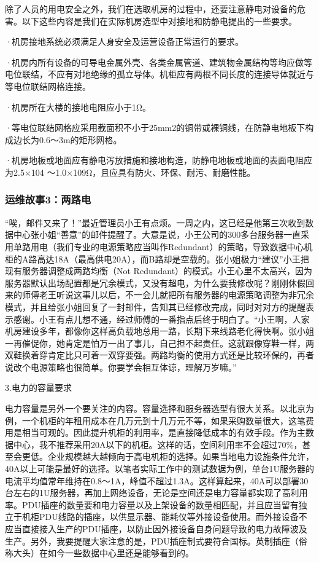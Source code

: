 \documentclass[12pt,UTF8]{ctexbook}
\begin{document}
除了人员的用电安全之外，我们在选取机房的过程中，还要注意静电对设备的危害。以下这些内容是我们在实际机房选型中对接地和防静电提出的一些要求。

·机房接地系统必须满足人身安全及运营设备正常运行的要求。

·机房内所有设备的可导电金属外壳、各类金属管道、建筑物金属结构等均应做等电位联结，不应有对地绝缘的孤立导体。机柜应有两根不同长度的连接导体就近与等电位联结网格连接。

·机房所在大楼的接地电阻应小于1Ω。

·等电位联结网格应采用截面积不小于25mm2的铜带或裸铜线，在防静电地板下构成边长为0.6～3m的矩形网格。

·机房地板或地面应有静电泻放措施和接地构造，防静电地板或地面的表面电阻应为2.5×104
～1.0×109Ω，且应具有防火、环保、耐污、耐磨性能。

\subsubsection{运维故事3：两路电}

“唉，邮件又来了！”最近管理员小王有点烦。一周之内，这已经是他第三次收到数据中心张小姐“善意”的邮件提醒了。大意是说，小王公司的300多台服务器一直采用单路用电（我们专业的电源策略应当叫作Redundant）的策略，导致数据中心机柜的A路高达18A（最高供电20A），而B路却是空载的。张小姐极力“建议”小王把现有服务器调整成两路均衡（Not Redundant）的模式。小王心里不太高兴，因为服务器默认出场配置都是冗余模式，又没有超电，为什么要我修改呢？刚刚休假回来的师傅老王听说这事儿以后，不一会儿就把所有服务器的电源策略调整为非冗余模式，并且给张小姐回复了一封邮件，告知其已经修改完成，同时对对方的提醒表示感谢。小王有点儿想不通，经过师傅的一番指点后终于明白了。“小王啊，人家机房建设多年，都像你这样高负载地总用一路，长期下来线路老化得快啊。张小姐一再催促你，她肯定是怕万一出了事儿，自己担不起责任。这就跟像穿鞋一样，两双鞋换着穿肯定比只可着一双穿要强。两路均衡的使用方式还是比较环保的，再者说改个电源策略也很简单。你要学会相互体谅，理解万岁嘛。”

3.电力的容量要求

电力容量是另外一个要关注的内容。容量选择和服务器选型有很大关系。以北京为例，一个机柜的年租用成本在几万元到十几万元不等，如果采购数量很大，这笔费用是相当可观的。因此提升机柜的利用率，是直接降低成本的有效手段。作为主数据中心，我不推荐采用20A以下的机柜。这样的话，空间利用率不会超过70\%，甚至会更低。企业规模越大越倾向于高电机柜的选择。如果当地电力设施条件允许，40A以上可能是最好的选择。以笔者实际工作中的测试数据为例，单台1U服务器的电流平均值常年维持在0.8～1A，峰值不超过1.3A。这样算起来，40A可以部署30台左右的1U服务器，再加上网络设备，无论是空间还是电力容量都实现了高利用率。PDU插座的数量要和电力容量以及上架设备的数量相匹配，并且应当留有独立于机柜PDU线路的插座，以供显示器、能耗仪等外接设备使用。而外接设备不应当直接接入生产的PDU插座，以防止因外接设备自身问题导致的电力故障波及生产。另外，我要提醒大家注意的是，PDU插座制式要符合国标。英制插座（俗称大头）在如今一些数据中心里还是能够看到的。
\end{document}

